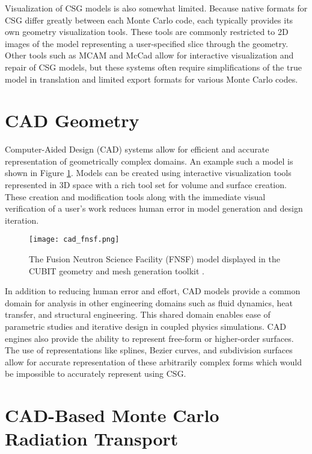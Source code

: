Visualization of CSG models is also somewhat limited. Because native formats for
CSG differ greatly between each Monte Carlo code, each typically provides its
own geometry visualization tools. These tools are commonly restricted to 2D
images of the model representing a user-specified slice through the
geometry. Other tools such as MCAM \cite{Liu_2005} and McCad
\cite{Tsigetamirat_2008} allow for interactive visualization and repair of CSG
models, but these systems often require simplifications of the true model in
translation and limited export formats for various Monte Carlo codes.

\section{CAD Geometry}

Computer-Aided Design (CAD) systems allow for efficient and accurate
representation of geometrically complex domains. An example such a model is
shown in Figure \ref{fig:cad_fnsf}. Models can be created using interactive
visualization tools represented in 3D space with a rich tool set for volume and
surface creation. These creation and modification tools along with the immediate
visual verification of a user's work reduces human error in model generation and
design iteration.

\begin{figure}[H]
  \centering
  \texttt{[image: cad\_fnsf.png]}
  \caption[CAD image of the FNSF facility.]{The Fusion Neutron Science Facility (FNSF)\cite{Kessel_2017} model
    displayed in the CUBIT geometry and mesh generation toolkit \cite{Blacker_1994}.}
  \label{fig:cad_fnsf}
\end{figure}

In addition to reducing human error and effort, CAD models provide a common
domain for analysis in other engineering domains such as fluid dynamics, heat
transfer, and structural engineering. This shared domain enables ease of
parametric studies and iterative design in coupled physics simulations. CAD
engines also provide the ability to represent free-form or higher-order
surfaces. The use of representations like splines, Bezier curves, and
subdivision surfaces allow for accurate representation of these arbitrarily
complex forms which would be impossible to accurately represent using CSG.

\section{CAD-Based Monte Carlo Radiation Transport}

